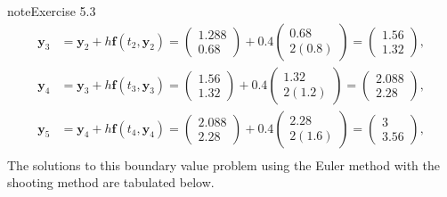 \documentclass[letterpaper,10pt,english]{jupyterBook}
\begin{document}
\begin{sphinxadmonition}{note}{Exercise 5.3}
\begin{align*}
    \mathbf{y}_3 &= \mathbf{y}_2 + h \mathbf{f}(t_2, \mathbf{y}_2) 
    = \begin{pmatrix} 1.288 \\ 0.68 \end{pmatrix} + 0.4 \begin{pmatrix} 0.68 \\ 2(0.8) \end{pmatrix} 
    = \begin{pmatrix} 1.56 \\ 1.32 \end{pmatrix}, \\
    \mathbf{y}_4 &= \mathbf{y}_3 + h \mathbf{f}(t_3, \mathbf{y}_3) 
    = \begin{pmatrix} 1.56 \\ 1.32 \end{pmatrix} + 0.4 \begin{pmatrix} 1.32 \\ 2(1.2) \end{pmatrix} 
    = \begin{pmatrix} 2.088 \\ 2.28 \end{pmatrix}, \\
    \mathbf{y}_5 &= \mathbf{y}_4 + h \mathbf{f}(t_4, \mathbf{y}_4) 
    = \begin{pmatrix} 2.088 \\ 2.28 \end{pmatrix} + 0.4 \begin{pmatrix} 2.28 \\ 2(1.6) \end{pmatrix} 
    = \begin{pmatrix} 3 \\ 3.56 \end{pmatrix}, \\
\end{align*}
\sphinxAtStartPar
The solutions to this boundary value problem using the Euler method with the shooting method are tabulated below.



\end{sphinxadmonition}
\end{document}
